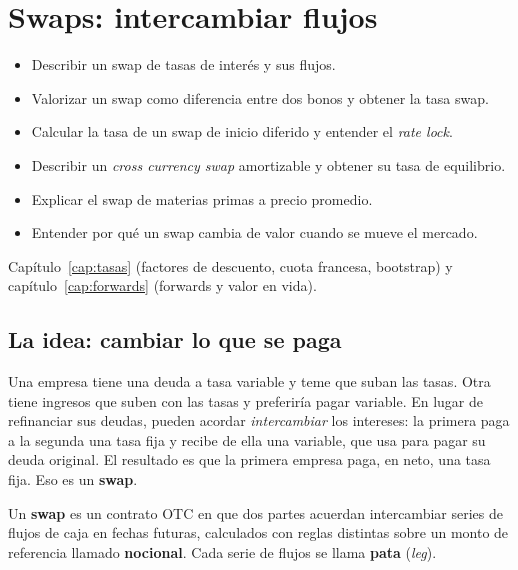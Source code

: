\chapter{Swaps: intercambiar flujos}\label{cap:swaps}

\begin{objetivos}
\begin{itemize}
\item Describir un swap de tasas de interés y sus flujos.
\item Valorizar un swap como diferencia entre dos bonos y obtener la tasa swap.
\item Calcular la tasa de un swap de inicio diferido y entender el \emph{rate lock}.
\item Describir un \emph{cross currency swap} amortizable y obtener su tasa de equilibrio.
\item Explicar el swap de materias primas a precio promedio.
\item Entender por qué un swap cambia de valor cuando se mueve el mercado.
\end{itemize}
\end{objetivos}

\begin{prerreq}Capítulo~\ref{cap:tasas} (factores de descuento, cuota francesa, bootstrap) y capítulo~\ref{cap:forwards} (forwards y valor en vida).\end{prerreq}

\section{La idea: cambiar lo que se paga}

Una empresa tiene una deuda a tasa variable y teme que suban las tasas. Otra tiene ingresos que suben con las tasas y preferiría pagar variable. En lugar de refinanciar sus deudas, pueden acordar \emph{intercambiar} los intereses: la primera paga a la segunda una tasa fija y recibe de ella una variable, que usa para pagar su deuda original. El resultado es que la primera empresa paga, en neto, una tasa fija. Eso es un \textbf{swap}.

\begin{definicion}[Swap]
Un \textbf{swap} es un contrato OTC en que dos partes acuerdan intercambiar series de flujos de caja en fechas futuras, calculados con reglas distintas sobre un monto de referencia llamado \textbf{nocional}. Cada serie de flujos se llama \textbf{pata} (\emph{leg}).
\end{definicion}

